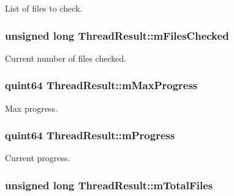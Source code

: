 List of files to check. 

\hypertarget{class_thread_result_acc0b57f2dd6c0d3ff84e88e86e5e5464}{
\subsubsection[{m\-Files\-Checked}]{\setlength{\rightskip}{0pt plus 5cm}unsigned long Thread\-Result\-::m\-Files\-Checked\hspace{0.3cm}{\ttfamily [protected]}}}\label{class_thread_result_acc0b57f2dd6c0d3ff84e88e86e5e5464}


Current number of files checked. 

\hypertarget{class_thread_result_a060f28123eea6a0c777ab488aa378ed6}{
\subsubsection[{m\-Max\-Progress}]{\setlength{\rightskip}{0pt plus 5cm}quint64 Thread\-Result\-::m\-Max\-Progress\hspace{0.3cm}{\ttfamily [protected]}}}\label{class_thread_result_a060f28123eea6a0c777ab488aa378ed6}


Max progress. 

\hypertarget{class_thread_result_a51c4763ca09dbec15f74b2fbccecc467}{
\subsubsection[{m\-Progress}]{\setlength{\rightskip}{0pt plus 5cm}quint64 Thread\-Result\-::m\-Progress\hspace{0.3cm}{\ttfamily [protected]}}}\label{class_thread_result_a51c4763ca09dbec15f74b2fbccecc467}


Current progress. 

\hypertarget{class_thread_result_a387d860d3a9d220642efd8d8240e6d5c}{
\subsubsection[{m\-Total\-Files}]{\setlength{\rightskip}{0pt plus 5cm}unsigned long Thread\-Result\-::m\-Total\-Files\hspace{0.3cm}{\ttfamily [protected]}}}\label{class_thread_result_a387d860d3a9d220642efd8d8240e6d5c}


